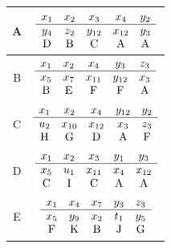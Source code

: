 \documentclass[pdftex]{sigma}
\numberwithin{equation}{section}
\theoremstyle{definition}
\begin{document}
\begin{table}[th!]\renewcommand{\arraystretch}{1.2}
\centering
\begin{tabular}{|c|c|} \hline
A & $\begin{array}{ccccc}
x_1&x_2&x_3&x_4&y_2 \\ \hline
y_4&z_2&y_{12}&x_{12}&y_3 \\
\text D&\text B&\text C&\text A&\text A
\end{array}$ \\ \hline
B & $\begin{array}{ccccc}
x_1&x_2&x_4&y_3&z_3 \\ \hline
x_5&x_7&x_{11}&y_{12}&x_3 \\
\text B&\text E&\text F&\text F&\text A
\end{array}$ \\ \hline
C & $\begin{array}{ccccc}
x_1&x_2&x_4&y_{12}&y_2 \\ \hline
u_2&x_{10}&x_{12}&x_3&z_3 \\
\text H&\text G&\text D&\text A&\text F
\end{array}$ \\ \hline
D & $\begin{array}{ccccc}
x_1&x_2&x_3&y_1&y_3 \\ \hline
x_5&u_1&x_{11}&x_{4}&x_{12} \\
\text C&\text I&\text C&\text A&\text A
\end{array}$ \\ \hline
E & $\begin{array}{ccccc}
x_1&x_4&x_7&y_3&z_3 \\ \hline
x_5&y_9&x_2&t_1&y_5 \\
\text F&\text K&\text B&\text J&\text G
\end{array}$ \\ \hline
\end{tabular}
\end{table}
\end{document}
